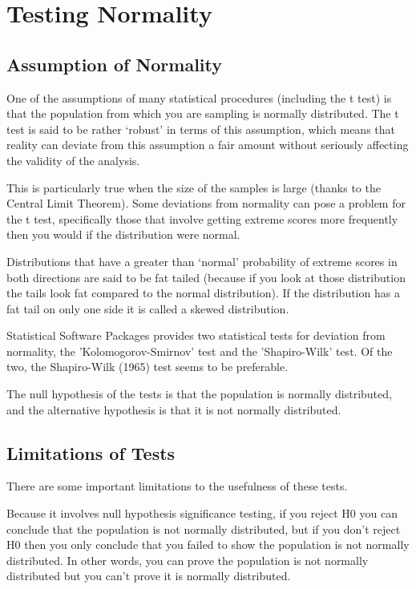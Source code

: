 \section{Testing Normality}

\subsection{Assumption of Normality}

One of the assumptions of many statistical procedures (including the t test) is that the population from which you are sampling is normally distributed. The t test is said to be rather ‘robust’ in terms of this assumption, which means that reality can deviate from this assumption a fair amount without seriously affecting the validity of the analysis. 

This is particularly true when the size of the samples is large (thanks to the Central Limit Theorem). Some deviations from normality can pose a problem for the t test, specifically those that involve getting extreme scores more frequently then you would if the distribution were normal. 

Distributions that have a greater than ‘normal’ probability of extreme scores in both directions are said to be fat tailed (because if you look at those distribution the tails look fat compared to the normal distribution). If the distribution has a fat tail on only one side it is called a skewed distribution. 
 
Statistical Software Packages provides two statistical tests for deviation from normality, the 'Kolomogorov-Smirnov' test and the 'Shapiro-Wilk' test. Of the two, the Shapiro-Wilk (1965) test seems to be preferable.

The null hypothesis of the tests is that the population is normally distributed, and the alternative hypothesis is that it is not normally distributed. 

\subsection{Limitations of Tests}
There are some important limitations to the usefulness of these tests.
 
Because it involves null hypothesis significance testing, if you reject H0 you can conclude that the population is not normally distributed, but if you don't reject H0 then you only conclude that you failed to show the population is not normally distributed. In other words, you can prove the population is not normally distributed but you can't prove it is normally distributed.
 
